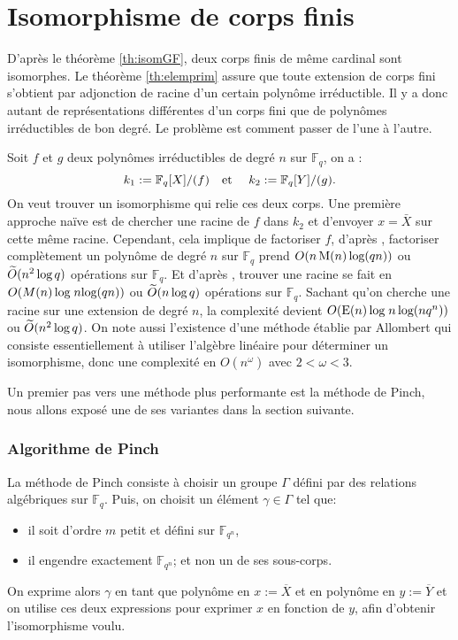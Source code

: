\documentclass[a4paper]{article} %
\numberwithin{section}{part}
\numberwithin{equation}{section}
\newcommand\GF[1]{\mathbb{F}_{#1}}
\newcommand\etmath{\textup{\quad et \quad}}
\newcommand\M[1]{\textup{M}(#1)}
\newcommand\E[1]{\textup{E}(#1)}
\newcommand\tO[1]{\widetilde{O}(#1)}
\begin{document}
\part{Isomorphisme de corps finis}
\label{deux}
D'après le théorème \ref{th:isomGF}, deux corps finis de même cardinal sont
isomorphes. Le théorème \ref{th:elemprim} assure que toute extension de corps 
fini s'obtient par adjonction de racine d'un certain polynôme irréductible. Il y
a donc autant de représentations différentes d'un corps fini que de polynômes 
irréductibles de bon degré. Le problème est comment passer de l'une à 
l'autre.\par
Soit $f$ et $g$ deux polynômes irréductibles de degré $n$ sur $\GF{q}$, on a :
\begin{equation}
k_1 := \GF{q}[X]/(f) \etmath k_2 := \GF{q}[Y]/(g). 
\end{equation}
On veut trouver un isomorphisme qui relie ces deux corps. Une première approche 
naïve est de chercher une racine de $f$ dans $k_2$ et d'envoyer $x = \bar{X}$ 
sur cette même racine. Cependant, cela implique de factoriser $f$, d'après 
\cite[th. 14.14]{GaGe}, factoriser complètement un polynôme de degré $n$ sur 
$\GF{q}$ prend $O(n\,\M{n}\,\textup{log}(qn))$ ou $\tO{n^2\,\textup{log\,}q}$
opérations sur $\GF{q}$. Et d'après \cite[cor. 14.16]{GaGe}, trouver une racine 
se fait en $O(M(n)\,\textup{log\;}n\textup{log}(qn))$ ou 
$\tO{n\,\textup{log\,}q}$ opérations sur $\GF{q}$. Sachant qu'on cherche une 
racine sur une extension de degré $n$, la complexité devient 
$O(\E{n}\,\textup{log\;}n\,\textup{log}(nq^n))$ ou $\tO{n^2\,\textup{log\,}q}$.
On note aussi l'existence d'une méthode établie par Allombert\cite{All} qui 
consiste essentiellement à utiliser l'algèbre linéaire pour déterminer un
isomorphisme, donc une complexité en $O(n^{\omega})$ avec $2<\omega<3$.\par
Un premier pas vers une méthode plus performante est la méthode de Pinch, 
nous allons exposé une de ses variantes dans la section suivante.

\section{Algorithme de Pinch}
La méthode de Pinch consiste à choisir un groupe $\Gamma$ défini par des 
relations algébriques sur $\GF{q}$. Puis, on choisit un élément 
$\gamma\in\Gamma$ tel que:
\vspace{0.3cm}
\begin{itemize}
\item il soit d'ordre $m$ petit et défini sur $\GF{q^n}$,
\item il engendre exactement $\GF{q^n}$; et non un de ses sous-corps.
\end{itemize}
\vspace{0.3cm}
On exprime alors $\gamma$ en tant que polynôme en $x := \overline{X}$ et en 
polynôme en $y := \overline{Y}$ et on utilise ces deux expressions pour exprimer
$x$ en fonction de $y$, afin d'obtenir l'isomorphisme voulu.\par
\end{document}
